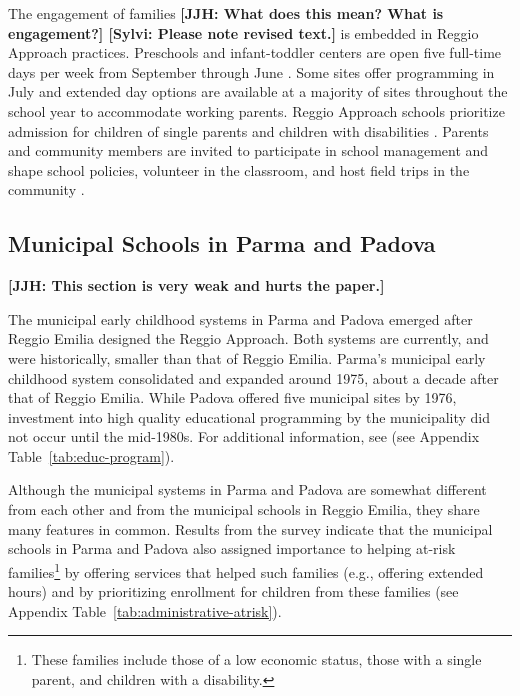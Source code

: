 The engagement of families \textbf{[JJH: What does this mean? What is engagement?] [Sylvi: Please note revised text.]} is embedded in Reggio Approach practices. Preschools and infant-toddler centers are open five full-time days per week from September through June \citep{Giudici-Nicolosi_2014_Reggio-Approach}. Some sites offer programming in July and extended day options are available at a majority of sites throughout the school year to accommodate working parents. Reggio Approach schools prioritize admission for children of single parents and children with disabilities \citep{Edwards-etal-eds_1998_Hundred-Languages}. Parents and community members are invited to participate in school management and shape school policies, volunteer in the classroom, and host field trips in the community \citep{CEHD_2016_Historical-Analysis,Cagliari-etal-eds_2016_BOOK_Loris-Malaguzzi}.

\subsection{Municipal Schools in Parma and Padova}

\textbf{[JJH: This section is very weak and hurts the paper.]}

The municipal early childhood systems in Parma and Padova emerged after Reggio Emilia designed the Reggio Approach. Both systems are currently, and were historically, smaller than that of Reggio Emilia. Parma's municipal early childhood system consolidated and expanded around 1975, about a decade after that of Reggio Emilia. While Padova offered five municipal sites by 1976, investment into high quality educational programming by the municipality did not occur until the mid-1980s. For additional information, see (see Appendix Table~\ref{tab:educ-program}).

Although the municipal systems in Parma and Padova are somewhat different from each other and from the municipal schools in Reggio Emilia, they share many features in common. Results from the survey indicate that the municipal schools in Parma and Padova also assigned importance to helping at-risk families\footnote{These families include those of a low economic status, those with a single parent, and children with a disability.} by offering services that helped such families (e.g., offering extended hours) and by prioritizing enrollment for children from these families (see Appendix Table~\ref{tab:administrative-atrisk}).

